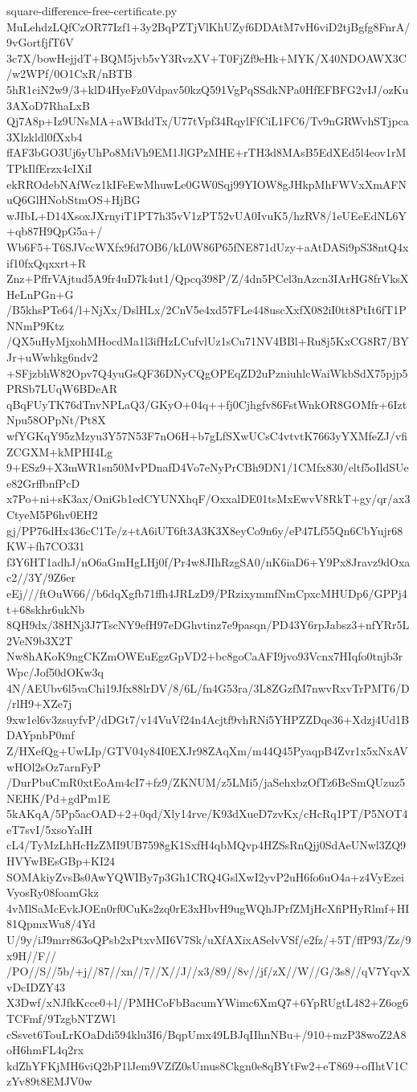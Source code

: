 \documentclass[11pt]{article}
\theoremstyle{definition}
\theoremstyle{remark}
\begin{document}
\begin{filecontents*}[overwrite]{square-difference-free-certificate.py}
MuLehdzLQfCzOR77Izf1+3y2BqPZTjVlKhUZyf6DDAtM7vH6viD2tjBgfg8FnrA/9vGortfjfT6V
3c7X/bowHejjdT+BQM5jvb5vY3RvzXV+T0FjZf9eHk+MYK/X40NDOAWX3C/w2WPf/0O1CxR/nBTB
5hR1ciN2w9/3+klD4HyeFz0Vdpav50kzQ591VgPqSSdkNPa0HfEFBFG2vIJ/ozKu3AXoD7RhaLxB
Qj7A8p+Iz9UNsMA+aWBddTx/U77tVpf34RqylFfCiL1FC6/Tv9nGRWvhSTjpca3Xlzkldl0fXxb4
ffAF3bGO3Uj6yUhPo8MiVh9EM1JlGPzMHE+rTH3d8MAsB5EdXEd5l4eov1rMTPkIlfErzx4cIXiI
ekRROdebNAfWcz1kIFeEwMhuwLe0GW0Sqj99YIOW8gJHkpMhFWVxXmAFNuQ6GlHNobStmOS+HjBG
wJIbL+D14XsoxJXrnyiT1PT7h35vV1zPT52vUA0IvuK5/hzRV8/1eUEeEdNL6Y+qb87H9QpG5a+/
Wb6F5+T6SJVccWXfx9fd7OB6/kL0W86P65fNE871dUzy+aAtDASi9pS38ntQ4xif10fxQqxxrt+R
Znz+PffrVAjtud5A9fr4uD7k4ut1/Qpcq398P/Z/4dn5PCel3nAzcn3IArHG8frVksXHeLnPGn+G
/B5khsPTe64/l+NjXx/DslHLx/2CnV5e4xd57FLe448uscXxfX082iI0tt8PtIt6fT1PNNmP9Ktz
/QX5uHyMjxohMHocdMa1l3ifHzLCufvlUz1sCu71NV4BBl+Ru8j5KxCG8R7/BYJr+uWwhkg6ndv2
+SFjzbhW82Opv7Q4yuGsQF36DNyCQgOPEqZD2uPzniuhlcWaiWkbSdX75pjp5PRSb7LUqW6BDeAR
qBqFUyTK76dTnvNPLaQ3/GKyO+04q++fj0Cjhgfv86FstWnkOR8GOMfr+6IztNpu58OPpNt/Pt8X
wfYGKqY95zMzyu3Y57N53F7nO6H+b7gLfSXwUCsC4vtvtK7663yYXMfeZJ/vfiZCGXM+kMPHI4Lg
9+ESz9+X3mWR1sn50MvPDnafD4Vo7eNyPrCBh9DN1/1CMfx830/eltf5oIldSUee82GrffbnfPcD
x7Po+ni+sK3ax/OniGb1edCYUNXhqF/OxxalDE01tsMxEwvV8RkT+gy/qr/ax3CtyeM5P6hv0EH2
gj/PP76dHx436cC1Te/z+tA6iUT6ft3A3K3X8eyCo9n6y/eP47Lf55Qn6CbYujr68KW+fh7CO331
f3Y6HT1adhJ/nO6aGmHgLHj0f/Pr4w8JIhRzgSA0/nK6iaD6+Y9Px8Jravz9dOxac2//3Y/9Z6er
eEj///ftOuW66//b6dqXgfb71ffh4JRLzD9/PRzixymmfNmCpxcMHUDp6/GPPj4t+68skhr6ukNb
8QH9dx/38HNj3J7TscNY9efH97eDGhvtinz7e9pasqn/PD43Y6rpJabsz3+nfYRr5L2VeN9b3X2T
Nw8hAKoK9ngCKZmOWEuEgzGpVD2+bc8goCaAFI9jvo93Vcnx7HIqfo0tnjb3rWpc/Jof50dOKw3q
4N/AEUbv6l5vaChi19Jfx88lrDV/8/6L/fn4G53ra/3L8ZGzfM7nwvRxvTrPMT6/D/rlH9+XZe7j
9xw1el6v3zsuyfvP/dDGt7/v14VuVf24n4Acjtf9vhRNi5YHPZZDqe36+Xdzj4Ud1BDAYpnbP0mf
Z/HXefQg+UwLIp/GTV04y84I0EXJr98ZAqXm/m44Q45PyaqpB4Zvr1x5xNxAVwHOl2sOz7arnFyP
/DurPbuCmR0xtEoAm4cI7+fz9/ZKNUM/z5LMi5/jaSehxbzOfTz6BeSmQUzuz5NEHK/Pd+gdPm1E
5kAKqA/5Pp5acOAD+2+0qd/Xly14rve/K93dXueD7zvKx/cHcRq1PT/P5NOT4eT7svI/5xsoYaIH
cL4/TyMzLhHcHzZMI9UB7598gK1SxfH4qbMQvp4HZSsRnQjj0SdAeUNwl3ZQ9HVYwBEsGBp+KI24
SOMAkiyZvsBs0AwYQWIBy7p3Gh1CRQ4GslXwI2yvP2uH6fo6uO4a+z4VyEzeiVyosRy08foamGkz
4vMlSaMcEvkJOEn0rf0CuKs2zq0rE3xHbvH9ugWQhJPrfZMjHcXfiPHyRlmf+HI81QpmxWu8/4Yd
U/9y/iJ9mrr863oQPsb2xPtxvMI6V7Sk/uXfAXixASelvVSf/e2fz/+5T/ffP93/Zz/9x9H//F//
/PO//S//5b/+j//87//xn//7//X//J//x3/89//8v//jf/zX//W//G/3s8//qV7YqvXvDcIDZY43
X3Dwf/xNJfkKcce0+l//PMHCoFbBacumYWimc6XmQ7+6YpRUgtL482+Z6og6TCFmf/9TzgbNTZWl
cSsvet6TouLrKOaDdi594klu3I6/BqpUmx49LBJqIIhnNBu+/910+mzP38woZ2A8oH6hmFL4q2rx
kdZhYFKjMH6viQ2bP1lJem9VZfZ0sUmus8Ckgn0e8qBYtFw2+eT869+ofIhtV1CzYv89t8EMJV0w

\end{filecontents*}
\end{document}
